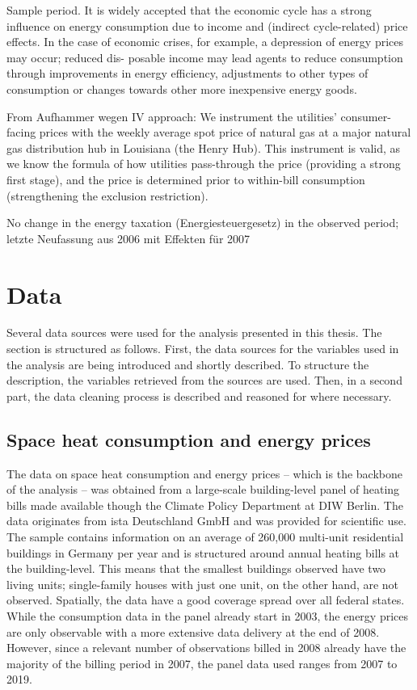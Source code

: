 \documentclass[12pt,twoside]{reedthesis}
\begin{document}
Sample period. It is widely accepted that the economic cycle has a strong influence on energy consumption due to income and (indirect cycle-related) price effects. In the case of economic crises, for example, a depression of energy prices may occur; reduced dis- posable income may lead agents to reduce consumption through improvements in energy efficiency, adjustments to other types of consumption or changes towards other more inexpensive energy goods.

From Aufhammer wegen IV approach:
We instrument the utilities' consumer-facing prices with the weekly average spot price of natural gas at a major natural gas distribution hub in Louisiana (the Henry Hub). This instrument is valid, as we know the formula of how utilities pass-through the price (providing a strong first stage), and the price is determined prior to within-bill consumption (strengthening the exclusion restriction).

No change in the energy taxation (Energiesteuergesetz) in the observed period; letzte Neufassung aus 2006 mit Effekten für 2007

\hypertarget{data}{%
\chapter{Data}\label{data}}

Several data sources were used for the analysis presented in this thesis. The section is structured as follows. First, the data sources for the variables used in the analysis are being introduced and shortly described. To structure the description, the variables retrieved from the sources are used. Then, in a second part, the data cleaning process is described and reasoned for where necessary.

\hypertarget{ista_data}{%
\section{Space heat consumption and energy prices}\label{ista_data}}

The data on space heat consumption and energy prices -- which is the backbone of the analysis -- was obtained from a large-scale building-level panel of heating bills made available though the Climate Policy Department at DIW Berlin. The data originates from ista Deutschland GmbH and was provided for scientific use. The sample contains information on an average of 260,000 multi-unit residential buildings in Germany per year and is structured around annual heating bills at the building-level. This means that the smallest buildings observed have two living units; single-family houses with just one unit, on the other hand, are not observed. Spatially, the data have a good coverage spread over all federal states. While the consumption data in the panel already start in 2003, the energy prices are only observable with a more extensive data delivery at the end of 2008. However, since a relevant number of observations billed in 2008 already have the majority of the billing period in 2007, the panel data used ranges from 2007 to 2019.
\end{document}
